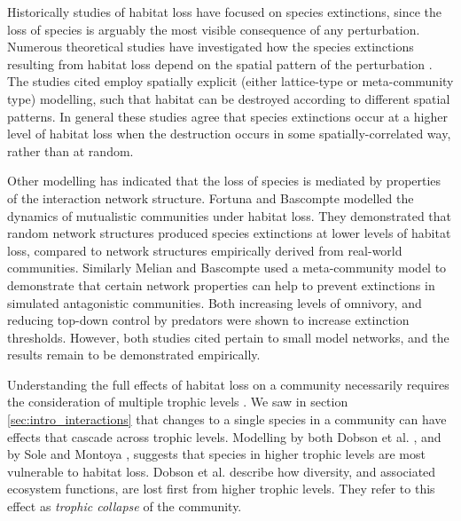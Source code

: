 Historically studies of habitat loss have focused on species extinctions, since the loss of species is arguably the most visible consequence of any perturbation. Numerous theoretical studies have investigated how the species extinctions resulting from habitat loss depend on the spatial pattern of the perturbation \cite{allen2007self,jager2006simulated,dytham1995effect,
hill1999habitat,travis2003climate,with1999extinction,ovaskainen2002metapopulation}. The studies cited employ spatially explicit (either lattice-type or meta-community type) modelling, such that habitat can be destroyed according to different spatial patterns. In general these studies agree that species extinctions occur at a higher level of habitat loss when the destruction occurs in some spatially-correlated way, rather than at random. 

Other modelling has indicated that the loss of species is mediated by properties of the interaction network structure. Fortuna and Bascompte \cite{fortuna2006habitat} modelled the dynamics of mutualistic communities under habitat loss. They demonstrated that random network structures produced species extinctions at lower levels of habitat loss, compared to network structures empirically derived from real-world communities. Similarly Melian and Bascompte \cite{melian2002food} used a meta-community model to demonstrate that certain network properties can help to prevent extinctions in simulated antagonistic communities. Both increasing levels of omnivory, and reducing top-down control by predators were shown to increase extinction thresholds. However, both studies cited pertain to small model networks, and the results remain to be demonstrated empirically.     

Understanding the full effects of habitat loss on a community necessarily requires the consideration of multiple trophic levels \cite{dobson2006habitat,sole2006ecological}. We saw in section \ref{sec:intro_interactions} that changes to a single species in a community can have effects that cascade across trophic levels. Modelling by both Dobson et al. \cite{dobson2006habitat}, and by Sole and Montoya \cite{sole2006ecological}, suggests that species in higher trophic levels are most vulnerable to habitat loss. Dobson et al. describe how diversity, and associated ecosystem functions, are lost first from higher trophic levels. They refer to this effect as \emph{trophic collapse} of the community.

